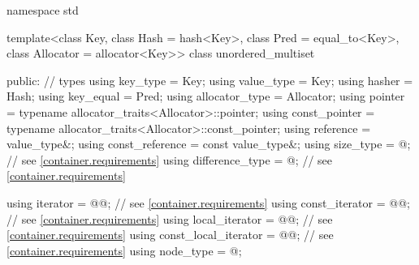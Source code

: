 %
\begin{codeblock}
namespace std {
  template<class Key,
           class Hash = hash<Key>,
           class Pred = equal_to<Key>,
           class Allocator = allocator<Key>>
  class unordered_multiset {
  public:
    // types
    using key_type             = Key;
    using value_type           = Key;
    using hasher               = Hash;
    using key_equal            = Pred;
    using allocator_type       = Allocator;
    using pointer              = typename allocator_traits<Allocator>::pointer;
    using const_pointer        = typename allocator_traits<Allocator>::const_pointer;
    using reference            = value_type&;
    using const_reference      = const value_type&;
    using size_type            = @\impdef@; // see \ref{container.requirements}
    using difference_type      = @\impdef@; // see \ref{container.requirements}

    using iterator             = @@; // see \ref{container.requirements}
    using const_iterator       = @@; // see \ref{container.requirements}
    using local_iterator       = @@; // see \ref{container.requirements}
    using const_local_iterator = @@; // see \ref{container.requirements}
    using node_type            = @\unspec@;

}}
\end{codeblock}
